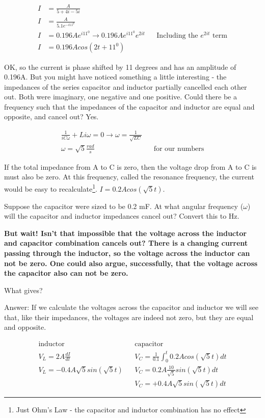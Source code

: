 \begin{align*}
I &= \frac{A}{5+4i-5i}\\
I &= \frac{A}{5.1e^{-i11^0}}\\
I &= 0.196Ae^{i11^0} \rightarrow 0.196Ae^{i11^0}e^{2it} && \text{Including the $e^{2it}$ term}\\
I &= 0.196Acos(2t+11^0)
\end{align*}

OK, so the current is phase shifted by 11 degrees and has an amplitude of 0.196A. But you might have noticed something a little interesting - the impedances of the series capacitor and inductor partially cancelled each other out. Both were imaginary, one negative and one positive. Could there be a frequency such that the impedances of the capacitor and inductor are equal and opposite, and cancel out? Yes.

\begin{align*}
\frac{1}{iC\omega}+Li\omega=0 \rightarrow \omega=\frac{1}{\sqrt{LC}}\\
\omega = \sqrt{5} \frac{rad}{s}&&\text{for our numbers}
\end{align*}

If the total impedance from A to C is zero, then the voltage drop from A to C is must also be zero. At this frequency, called the resonance frequency, the current would be easy to recalculate\footnote{Just Ohm's Law - the capacitor and inductor combination has no effect}. $I = 0.2Acos(\sqrt{5}t)$.

\begin{alevel}
Suppose the capacitor were sized to be 0.2 mF. At what angular frequency ($\omega$) will the capacitor and inductor impedances cancel out? Convert this to Hz.
\end{alevel}

\textbf{But wait! Isn't that impossible that the voltage across the inductor and capacitor combination cancels out? There is a changing current passing through the inductor, so the voltage across the inductor can not be zero. One could also argue, successfully, that the voltage across the capacitor also can not be zero.}\par

What gives?\par

Answer: If we calculate the voltages across the capacitor and inductor we will see that, like their impedances, the voltages are indeed not zero, but they are equal and opposite.

\begin{align*}
\text{inductor}			&&\text{capacitor}\\
V_L=2A\frac{dI}{dt}		&&V_C=\frac{1}{0.1}\int_0^t {0.2Acos(\sqrt{5}t)dt}\\
V_L=-0.4A\sqrt{5}sin(\sqrt{5}t)	&&V_C=0.2A\frac{10}{\sqrt{5}}sin(\sqrt{5}t)dt\\
				&&V_C=+0.4A\sqrt{5}sin(\sqrt{5}t)dt
\end{align*}

